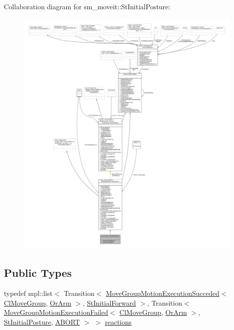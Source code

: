 Collaboration diagram for sm\+\_\+moveit\+:\+:St\+Initial\+Posture\+:
\nopagebreak
\begin{figure}[H]
\begin{center}
\leavevmode
\includegraphics[width=350pt]{structsm__moveit_1_1StInitialPosture__coll__graph}
\end{center}
\end{figure}
\subsection*{Public Types}
\begin{DoxyCompactItemize}
\item 
typedef mpl\+::list$<$ Transition$<$ \hyperlink{structmove__group__interface__client_1_1MoveGroupMotionExecutionSucceded}{Move\+Group\+Motion\+Execution\+Succeded}$<$ \hyperlink{classmove__group__interface__client_1_1ClMoveGroup}{Cl\+Move\+Group}, \hyperlink{classsm__moveit_1_1OrArm}{Or\+Arm} $>$, \hyperlink{structsm__moveit_1_1StInitialForward}{St\+Initial\+Forward} $>$, Transition$<$ \hyperlink{structmove__group__interface__client_1_1MoveGroupMotionExecutionFailed}{Move\+Group\+Motion\+Execution\+Failed}$<$ \hyperlink{classmove__group__interface__client_1_1ClMoveGroup}{Cl\+Move\+Group}, \hyperlink{classsm__moveit_1_1OrArm}{Or\+Arm} $>$, \hyperlink{structsm__moveit_1_1StInitialPosture}{St\+Initial\+Posture}, \hyperlink{classABORT}{A\+B\+O\+RT} $>$ $>$ \hyperlink{structsm__moveit_1_1StInitialPosture_ab6ac709f3c2758548901bc425791149c}{reactions}
\end{DoxyCompactItemize}
